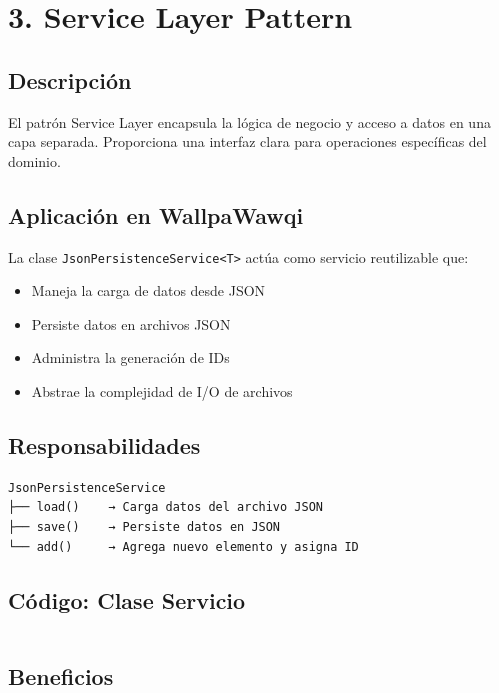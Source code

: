 \documentclass[12pt, a4paper]{report}
\begin{document}
\newpage

\section{3. Service Layer Pattern}

\subsection{Descripción}

El patrón Service Layer encapsula la lógica de negocio y acceso a datos en una capa separada. Proporciona una interfaz clara para operaciones específicas del dominio.

\subsection{Aplicación en WallpaWawqi}

La clase \texttt{JsonPersistenceService<T>} actúa como servicio reutilizable que:

\begin{itemize}
    \item Maneja la carga de datos desde JSON
    \item Persiste datos en archivos JSON
    \item Administra la generación de IDs
    \item Abstrae la complejidad de I/O de archivos
\end{itemize}

\subsection{Responsabilidades}

\begin{verbatim}
JsonPersistenceService
├── load()    → Carga datos del archivo JSON
├── save()    → Persiste datos en JSON
└── add()     → Agrega nuevo elemento y asigna ID
\end{verbatim}

\subsection{Código: Clase Servicio}

\inputminted[firstline=1, lastline=40]{java}{../../src/main/java/com/wallpawawqi/services/JsonPersistenceService.java}

\subsection{Beneficios}
\end{document}
